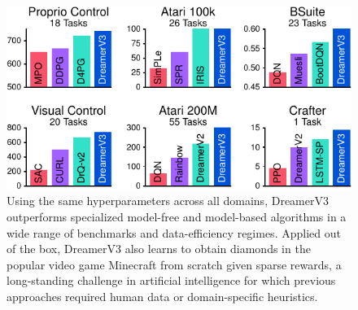 \begin{figure}[h!]
\centering
\begin{adjustwidth}{0em}{-.75em}
\includegraphics[width=0.63\linewidth]{summary/summary}\hfill%
%
\end{adjustwidth}
\caption{Using the same hyperparameters across all domains, DreamerV3 outperforms specialized model-free and model-based algorithms in a wide range of benchmarks and data-efficiency regimes. Applied out of the box, DreamerV3 also learns to obtain diamonds in the popular video game Minecraft from scratch given sparse rewards, a long-standing challenge in artificial intelligence for which previous approaches required human data or domain-specific heuristics.}
\label{fig:summary}
\vspace*{1ex}%
\end{figure}
